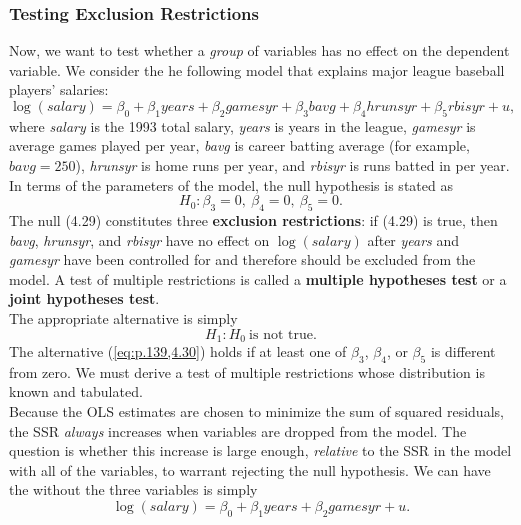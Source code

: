 \documentclass[a4paper, 10pt]{article}
\theoremstyle{definition}	%
\begin{document}
\subsubsection{Testing Exclusion Restrictions}
Now, we want to test whether a \textit{group} of variables has no effect on the dependent
variable. We consider the he following model that explains major league baseball players' salaries:
\begin{equation}
    \log(salary) = \beta_0 + \beta_1 years + \beta_2 gamesyr + \beta_3 bavg + \beta_4 hrunsyr + \beta_5 rbisyr + u, \label{eq:p.139,4.28}
\end{equation}
where \textit{salary} is the 1993 total salary, \textit{years} is years in the league, \textit{gamesyr} is average games played per year, \textit{bavg} is career batting average (for example, $bavg = 250$), \textit{hrunsyr} is home runs per year, and \textit{rbisyr} is runs batted in per year.\\
In terms of the parameters of the model, the null hypothesis is stated as
\begin{equation}
    H_0: \beta_3 = 0, \ \beta_4 = 0, \ \beta_5 = 0. \label{eq:p.139,4.29}
\end{equation}
The null (4.29) constitutes three \textbf{exclusion restrictions}: if (4.29) is true, then \textit{bavg}, \textit{hrunsyr}, and \textit{rbisyr} have no effect on $\log(salary)$ after \textit{years} and \textit{gamesyr} have been controlled for and therefore should be excluded from the model. A test of multiple restrictions is called a \textbf{multiple hypotheses test} or a \textbf{joint hypotheses test}.\\
The appropriate alternative is simply
\begin{equation}
    H_1: H_0 \ \text{is not true}. \label{eq:p.139,4.30}
\end{equation}
The alternative (\ref{eq:p.139,4.30}) holds if at least one of $\beta_3$, $\beta_4$, or $\beta_5$ is different from zero. We must derive a test of multiple restrictions whose distribution is known and tabulated. \\
Because the OLS estimates are chosen to minimize the sum of squared residuals, the SSR \textit{always} increases when variables are dropped from the model. The question is whether this increase is large enough, \textit{relative} to the SSR in the model with all of the variables, to warrant rejecting the null hypothesis. We can have the without the three variables is simply
\begin{equation}
    \log(salary) = \beta_0 + \beta_1 years + \beta_2 gamesyr + u. \label{eq:p.140,4.32}
\end{equation}
\end{document}

